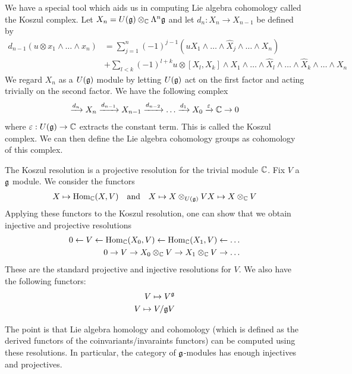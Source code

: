 \documentclass[12pt]{article}
\begin{document}
We have a special tool which aids us in computing Lie algebra cohomology called the Koszul complex.
Let $X_n = U(\mathfrak{g}) \otimes_{\mathbb{C}} \Lambda^n\mathfrak{g}$ and let $d_n:X_n\to X_{n-1}$ be defined by \begin{align*}
    d_{n-1}(u \otimes x_1 \wedge \dots \wedge x_n) &= \sum_{j=1}^n (-1)^{j-1}(uX_1 \wedge \dots \wedge \hat X_j \wedge \dots \wedge X_n) \\
    & +\sum_{l<k}(-1)^{l+k}u\otimes [X_l,X_k] \wedge X_1 \wedge \dots \wedge \hat X_l \wedge \dots \wedge \hat X_k \wedge \dots \wedge X_n
\end{align*} We regard $X_n$ as a $U(\mathfrak{g})$ module by letting $U(\mathfrak{g})$ act on the first factor and acting trivially on the second factor. We have the following complex \begin{align*}
    \xrightarrow{d_n} X_n \xrightarrow{d_{n-1}} X_{n-1} \xrightarrow{d_{n-2}} \dots \xrightarrow{d_1} X_0 \xrightarrow{\varepsilon} \mathbb{C} \to 0
\end{align*} where $\varepsilon:U(\mathfrak{g})\to \mathbb{C}$ extracts the constant term. This is
called the Koszul complex. We can then define the Lie algebra cohomology groups as cohomology of this complex.

The Koszul resolution is a projective resolution for the trivial module $\mathbb{C}$. Fix $V$ a $\mathfrak{g}$ module. 
We consider the functors \begin{align*}
    X \mapsto \operatorname{Hom}_{\mathbb{C}}(X,V) \quad\text{and}\quad X\mapsto X\otimes_{U(\mathfrak{g})}V
    X \mapsto X\otimes_{\mathbb{C}} V
\end{align*} Applying these functors to the Koszul resolution, one can show that we obtain injective and projective resolutions
\begin{align*}
    0 \leftarrow V \leftarrow \operatorname{Hom}_{\mathbb{C}}(X_0,V) \leftarrow \operatorname{Hom}_{\mathbb{C}}(X_1,V) \leftarrow \dots \\
    0 \to V \to X_0\otimes_{\mathbb{C}} V \to X_1\otimes_{\mathbb{C}} V \to \dots
\end{align*} These are the standard projective and injective resolutions for $V$. We also have the 
following functors:\begin{align*}
    V\mapsto V^{\mathfrak{g}} \\
    V \mapsto V/\mathfrak{g} V
\end{align*}

The point is that Lie algebra homology and cohomology (which is defined as the derived functors of the coinvariants/invaraints functors) can be computed
using these resolutions. In particular, the category of $\mathfrak{g}$-modules has enough injectives and projectives.
\end{document}
